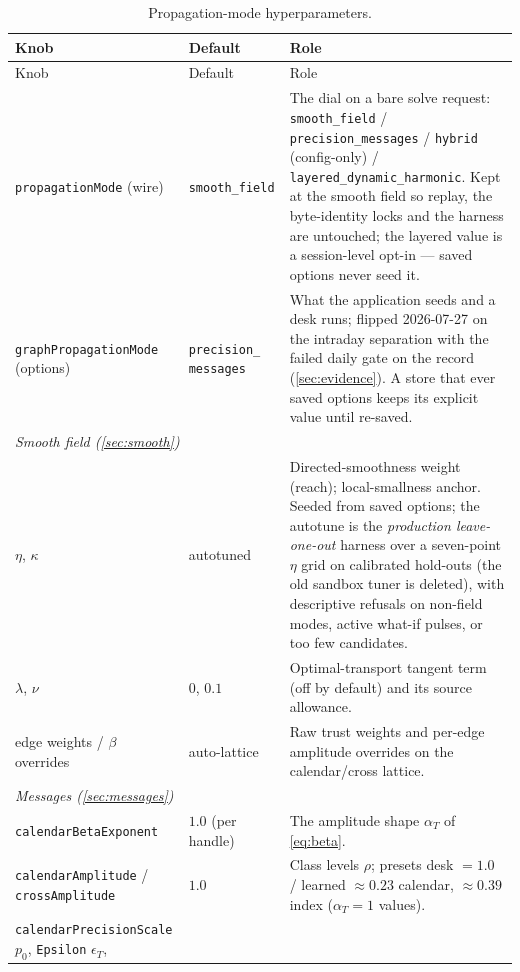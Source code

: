 \documentclass[11pt]{article}
\begin{document}
\begingroup
\small
\begin{longtable}{p{}p{}p{}}
\caption{Propagation-mode hyperparameters.}\label{tab:atlas}\\
\toprule Knob & Default & Role\\ \midrule
\endfirsthead \toprule Knob & Default & Role\\ \midrule \endhead
\texttt{propagationMode} (wire) & \texttt{smooth\_field} & The dial on a
bare solve request:
\texttt{smooth\_field} / \texttt{precision\_messages} / \texttt{hybrid}
(config-only) / \texttt{layered\_dynamic\_harmonic}.  Kept at the smooth
field so replay, the byte-identity locks and the harness are untouched;
the layered value is a
session-level opt-in --- saved options never seed it.\\
\texttt{graphPropagationMode} (options) & \texttt{precision\_\allowbreak
messages} & What the application seeds and a desk runs; flipped
2026-07-27 on the intraday separation with the failed daily gate on the
record (\cref{sec:evidence}).  A store that ever saved options keeps its
explicit value until re-saved.\\
\midrule
\multicolumn{3}{l}{\emph{Smooth field (\cref{sec:smooth})}}\\ \midrule
$\eta$, $\kappa$ & autotuned & Directed-smoothness weight (reach);
local-smallness anchor.  Seeded from saved options; the autotune is the
\emph{production leave-one-out} harness over a seven-point $\eta$ grid on
calibrated hold-outs (the old sandbox tuner is deleted), with
descriptive refusals on non-field modes, active what-if pulses, or too
few candidates.\\
$\lambda$, $\nu$ & $0$, $0.1$ & Optimal-transport tangent term (off by
default) and its source allowance.\\
edge weights / $\beta$ overrides & auto-lattice & Raw trust weights and
per-edge amplitude overrides on the calendar/cross lattice.\\
\midrule
\multicolumn{3}{l}{\emph{Messages (\cref{sec:messages})}}\\ \midrule
\texttt{calendarBetaExponent} & $1.0$ (per handle) & The amplitude shape
$\alpha_T$ of \eqref{eq:beta}.\\
\texttt{calendarAmplitude} / \texttt{crossAmplitude} & $1.0$ & Class
levels $\rho$; presets desk $=1.0$ / learned $\approx0.23$ calendar,
$\approx0.39$ index ($\alpha_T{=}1$ values).\\
\texttt{calendarPrecisionScale} $p_0$, \texttt{Epsilon} $\epsilon_T$,

\end{longtable}
\end{document}
